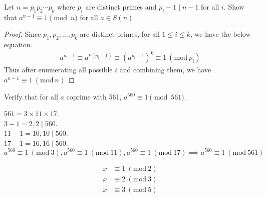 \documentclass[11pt]{article}
\newcommand{\Mod}[1]{\ (\mathrm{mod}\ #1)}
\begin{document}
\begin{Parts}
    \newpage
    \Part Let $n = p_1 p_2 \cdots p_k$ where $p_i$ are distinct primes and $p_i - 1 \mid n - 1$ for all $i$. Show that $a^{n-1} \equiv 1 \pmod{n}$ for all $a \in S(n)$ %
    \begin{Answer}
        \begin{proof}
            Since $p_1, p_2, \ldots, p_k$ are distinct primes, for all $1 \leq i \leq k$, we have the below equation. 
            \begin{align*}
                a^{n-1} \equiv a^{k(p_i - 1)} \equiv (a^{p_i - 1})^k \equiv 1 \Mod{p_i}
            \end{align*}
            Thus after enumerating all possible $i$ and combining them, we have $a^{n-1} \equiv 1 \Mod{n}$
        \end{proof}
    \end{Answer}

    \Part Verify that for all $a$ coprime with 561, $a^{560} \equiv 1 \pmod{561}$.
    \begin{Answer}
        $561 = 3 \times 11 \times 17$. \\
        $3 - 1 = 2, 2 \mid 560$. \\
        $11 - 1 = 10, 10 \mid 560$. \\
        $17 - 1 = 16, 16 \mid 560$. \\
        $a^{560} \equiv 1 \Mod{3}, a^{560} \equiv 1 \Mod{11}, a^{560} \equiv 1 \Mod{17} \implies a^{560} \equiv 1 \Mod{561}$ 
    \end{Answer}
\end{Parts}

\newpage
{}

\begin{align*}
    x &\equiv 1 \Mod{2} \\
    x &\equiv 2 \Mod{3} \\ 
    x &\equiv 3 \Mod{5} 
\end{align*}
\end{document}
